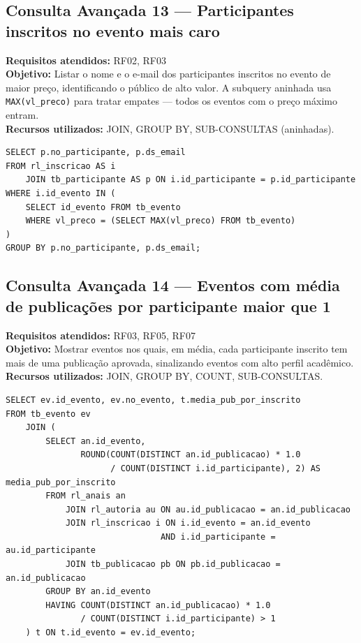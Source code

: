 \documentclass[12pt]{article}
\begin{document}
\subsection{Consulta Avançada 13 --- Participantes inscritos no evento mais caro}
\textbf{Requisitos atendidos:} RF02, RF03 \\
\textbf{Objetivo:} Listar o nome e o e-mail dos participantes inscritos no evento de maior preço, identificando o público de alto valor. A subquery aninhada usa \texttt{MAX(vl\_preco)} para tratar empates --- todos os eventos com o preço máximo entram. \\
\textbf{Recursos utilizados:} JOIN, GROUP BY, SUB-CONSULTAS (aninhadas).
\begin{lstlisting}[caption={QA13 --- Participantes inscritos no(s) evento(s) mais caro(s).}]
SELECT p.no_participante, p.ds_email
FROM rl_inscricao AS i
    JOIN tb_participante AS p ON i.id_participante = p.id_participante
WHERE i.id_evento IN (
    SELECT id_evento FROM tb_evento
    WHERE vl_preco = (SELECT MAX(vl_preco) FROM tb_evento)
)
GROUP BY p.no_participante, p.ds_email;
\end{lstlisting}

\subsection{Consulta Avançada 14 --- Eventos com média de publicações por participante maior que 1}
\textbf{Requisitos atendidos:} RF03, RF05, RF07 \\
\textbf{Objetivo:} Mostrar eventos nos quais, em média, cada participante inscrito tem mais de uma publicação aprovada, sinalizando eventos com alto perfil acadêmico. \\
\textbf{Recursos utilizados:} JOIN, GROUP BY, COUNT, SUB-CONSULTAS.
\begin{lstlisting}[caption={QA14 --- Eventos com média de publicações por inscrito maior que 1.}]
SELECT ev.id_evento, ev.no_evento, t.media_pub_por_inscrito
FROM tb_evento ev
    JOIN (
        SELECT an.id_evento,
               ROUND(COUNT(DISTINCT an.id_publicacao) * 1.0
                     / COUNT(DISTINCT i.id_participante), 2) AS media_pub_por_inscrito
        FROM rl_anais an
            JOIN rl_autoria au ON au.id_publicacao = an.id_publicacao
            JOIN rl_inscricao i ON i.id_evento = an.id_evento
                               AND i.id_participante = au.id_participante
            JOIN tb_publicacao pb ON pb.id_publicacao = an.id_publicacao
        GROUP BY an.id_evento
        HAVING COUNT(DISTINCT an.id_publicacao) * 1.0
               / COUNT(DISTINCT i.id_participante) > 1
    ) t ON t.id_evento = ev.id_evento;
\end{lstlisting}
\end{document}
